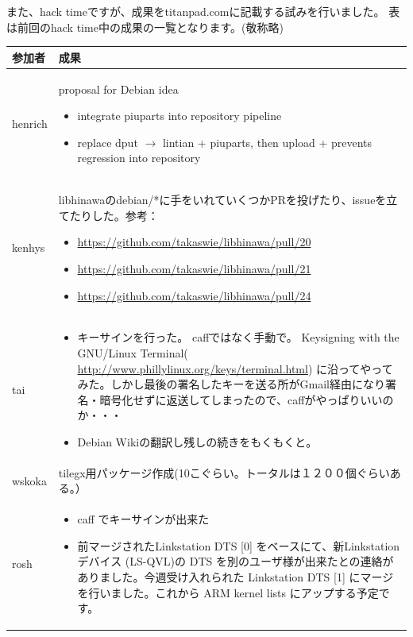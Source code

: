 \documentclass[mingoth,a4paper]{jsarticle}
\begin{document}
  また、hack timeですが、成果をtitanpad.comに記載する試みを行いました。
 表は前回のhack time中の成果の一覧となります。(敬称略)

\begin{table}
\begin{center}
  \begin{tabular}{|l|p{15cm}|}
    \hline
参加者 & 成果 \\ \hline \hline
henrich &   proposal for Debian idea
  \begin{itemize}
  \item integrate piuparts into repository pipeline
  \item replace dput $\rightarrow$ lintian + piuparts, then upload
   + prevents regression into repository
  \end{itemize} \\ \hline
kenhys & libhinawaのdebian/*に手をいれていくつかPRを投げたり、issueを立てたりした。参考：
\begin{itemize}
\item \url{https://github.com/takaswie/libhinawa/pull/20}
\item \url{https://github.com/takaswie/libhinawa/pull/21}
\item \url{https://github.com/takaswie/libhinawa/pull/24}
\end{itemize}\\ \hline
tai &   \begin{itemize}
    \item キーサインを行った。 caffではなく手動で。
    Keysigning with the GNU/Linux Terminal(
    \url{http://www.phillylinux.org/keys/terminal.html})
    に沿ってやってみた。しかし最後の署名したキーを送る所がGmail経由になり署名・暗号化せずに返送してしまったので、caffがやっぱりいいのか・・・
  \item Debian Wikiの翻訳し残しの続きをもくもくと。
  \end{itemize} \\ \hline
wskoka &   tilegx用パッケージ作成(10こぐらい。トータルは１２００個ぐらいある。）\\ \hline
rosh &
  \begin{itemize}
  \item caff でキーサインが出来た
  \item 前マージされたLinkstation DTS [0] をベースにて、新Linkstationデバイス (LS-QVL)の DTS を別のユーザ様が出来たとの連絡がありました。今週受け入れられた Linkstation DTS [1] にマージを行いました。これから ARM kernel lists にアップする予定です。
    \begin{enumerate}

\end{enumerate}
\end{itemize}
\end{tabular}
\end{center}
\end{table}
\end{document}
